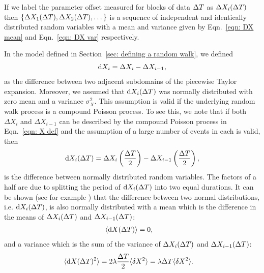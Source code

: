 \documentclass[../full_thesis/full_thesis.tex]{subfiles}
\begin{document}
If we label the parameter offset measured for blocks of data $\Delta T$ as  $\Delta
X_{i}(\Delta T)$ then $\{\Delta X_{1}(\Delta T), \Delta X_{2}(\Delta T), \dots\}$ is a
sequence of independent and identically distributed random variables with a mean
and variance given by Eqn.~\eqref{eqn: DX mean} and Eqn.~\eqref{eqn: DX var}
respectively.

In the model defined in Section~\ref{sec: defining a random walk}, we defined
\begin{align}
\mathrm{d} X_{i} = \Delta X_{i} - \Delta X_{i-1},
\end{align}
as the difference between two adjacent subdomains of the piecewise Taylor
expansion. Moreover, we assumed that $\mathrm{d} X_i(\Delta T)$ was normally distributed
with zero mean and a variance $\sigma_{X}^{2}$.  This assumption is valid if
the underlying random walk process is a compound Poisson process. To see this,
we note that if both $\Delta X_{i}$ and $\Delta X_{i-1}$ can be described by
the compound Poisson process in Eqn.~\eqref{eqn: X def} and the assumption of
a large number of events in each is valid, then
\begin{align}
\mathrm{d} X_{i}(\Delta T) =  \Delta X_{i}\left(\frac{\Delta T}{2}\right)
                - \Delta X_{i-1}\left(\frac{\Delta T}{2}\right),
\end{align}
is the difference between normally distributed random variables. The factors of
a half are due to splitting the period of $\mathrm{d} X_i(\Delta T)$ into two equal
durations. It can be shown (see for example \citet{wolframdifference})
that the difference between two normal distributions, i.e. $\mathrm{d} X_i (\Delta T)$, is
also normally distributed with a mean which is the difference in the means of
$\Delta X_{i}(\Delta T)$ and $\Delta X_{i-1}(\Delta T)$:
\begin{align}
\langle \mathrm{d} X(\Delta T) \rangle & = 0,
\label{eqn: Poisson expectation}
\end{align}
and a variance which is the sum of the variance of
$\Delta X_{i}(\Delta T)$ and $\Delta X_{i-1}(\Delta T)$:
\begin{align}
\langle \mathrm{d} X(\Delta T)^{2} \rangle &  =
2 \lambda \frac{\Delta T}{2} \langle \delta X^{2}\rangle
= \lambda \Delta T \langle \delta X^{2}\rangle.
\label{eqn: Poisson variance}
\end{align}
\end{document}
